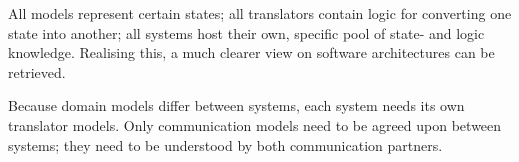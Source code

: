 All models represent certain states; all translators contain logic for
converting one state into another; all systems host their own, specific pool of
state- and logic knowledge. Realising this, a much clearer view on software
architectures can be retrieved.

Because domain models differ between systems, each system needs its own
translator models. Only communication models need to be agreed upon between
systems; they need to be understood by both communication partners.
